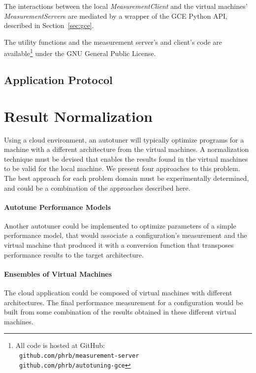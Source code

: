 \documentclass[a4paper, 12pt]{article}
\begin{document}
The interactions between the local \emph{MeasurementClient} and the virtual
machines' \emph{MeasurementServer}s are mediated by a wrapper of the
GCE Python API, described in Section~\ref{sec:gce}.

The utility functions and the measurement server's and client's code are
available\footnote{All code is hosted at GitHub: \\ \texttt{\scriptsize
github.com/phrb/measurement-server} \\ \texttt{\scriptsize
github.com/phrb/autotuning-gce}} under the GNU General Public License.

\subsection{Application Protocol}
\label{sec:app}


\section{Result Normalization}
\label{sec:norm}


Using a cloud environment, an autotuner will typically optimize programs for
a machine with a different architecture from the virtual machines. A
normalization technique must be devised that enables the results found in the
virtual machines to be valid for the local machine.  We present four
approaches to this problem. The best approach for each problem domain
must be experimentally determined, and could be a combination of the approaches
described here.

\paragraph{Autotune Performance Models}
Another autotuner could be implemented to optimize parameters of a simple
performance model, that would associate a configuration's measurement and the
virtual machine that produced it with a conversion function that transposes
performance results to the target architecture.

\paragraph{Ensembles of Virtual Machines}
The cloud application could be composed of virtual machines with different
architectures. The final performance measurement for a configuration would be
built from some combination of the results obtained in these different virtual
machines.
\end{document}
